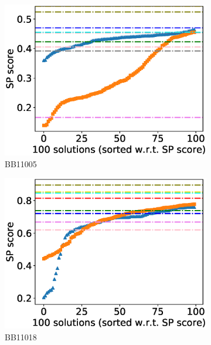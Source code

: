 \begin{figure}[!htbp]
\begin{adjustwidth}{-1cm}{-1cm}
		\begin{subfigure}{0.26\textwidth}
			\includegraphics[width=\columnwidth]{Figure/summary/precomputedInit/Balibase/BB11005_pairs_density_single_run_2}
			\caption{BB11005}
		\end{subfigure}    
		\begin{subfigure}{0.26\textwidth}
			\includegraphics[width=\columnwidth]{Figure/summary/precomputedInit/Balibase/BB11018_pairs_density_single_run_2}
			\caption{BB11018}
		\end{subfigure}
		\begin{subfigure}{0.26\textwidth}

\end{subfigure}
\end{adjustwidth}
\end{figure}
